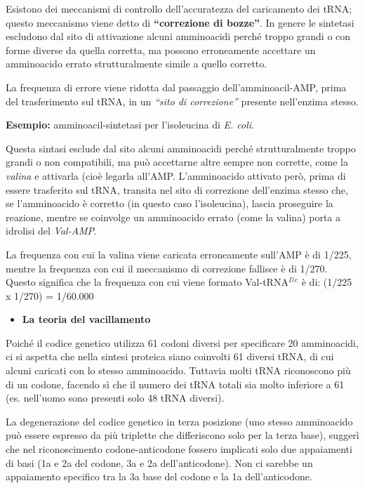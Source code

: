 \documentclass[11pt]{book}
\begin{document}
Esistono dei meccanismi di controllo dell'accuratezza del caricamento
dei tRNA; questo meccanismo viene detto di \textbf{``correzione di
bozze''}. In genere le sintetasi escludono dal sito di attivazione
alcuni amminoacidi perché troppo grandi o con forme diverse da quella
corretta, ma possono erroneamente accettare un amminoacido errato
strutturalmente simile a quello corretto.

La frequenza di errore viene ridotta dal passaggio dell'amminoacil-AMP,
prima del trasferimento sul tRNA, in un \emph{``sito di correzione''}
presente nell'enzima stesso.

\textbf{Esempio:} amminoacil-sintetasi per l'isoleucina di \emph{E.
coli}.

Questa sintasi esclude dal sito alcuni amminoacidi perché
strutturalmente troppo grandi o non compatibili, ma può accettarne altre
sempre non corrette, come la \emph{valina} e attivarla (cioè legarla
all'AMP. L'amminoacido attivato però, prima di essere trasferito sul
tRNA, transita nel sito di correzione dell'enzima stesso che, se
l'amminoacido è corretto (in questo caso l'isoleucina), lascia proseguire
la reazione, mentre se coinvolge un amminoacido errato (come la valina)
porta a idrolisi del \emph{Val-AMP}.

La frequenza con cui la valina viene caricata erroneamente sull'AMP è di
1/225, mentre la frequenza con cui il meccanismo di correzione fallisce
è di 1/270. Questo significa che la frequenza con cui viene formato
Val-tRNA\(^I\)\(^l\)\(^e\) è di: (1/225 x 1/270) = 1/60.000

\begin{itemize}
\itemsep1pt\parskip0pt
\item
  \textbf{La teoria del vacillamento}
\end{itemize}

Poiché il codice genetico utilizza 61 codoni diversi per specificare 20
amminoacidi, ci si aspetta che nella sintesi proteica siano coinvolti 61
diversi tRNA, di cui alcuni caricati con lo stesso amminoacido. Tuttavia
molti tRNA riconoscono più di un codone, facendo sì che il numero dei
tRNA totali sia molto inferiore a 61 (es. nell'uomo sono presenti solo
48 tRNA diversi).

La degenerazione del codice genetico in terza posizione (uno stesso
amminoacido può essere espresso da più triplette che differiscono solo
per la terza base), suggerì che nel riconoscimento codone-anticodone
fossero implicati solo due appaiamenti di basi (1a e 2a del codone, 3a e
2a dell'anticodone). Non ci sarebbe un appaiamento specifico tra la 3a
base del codone e la 1a dell'anticodone.
\end{document}
